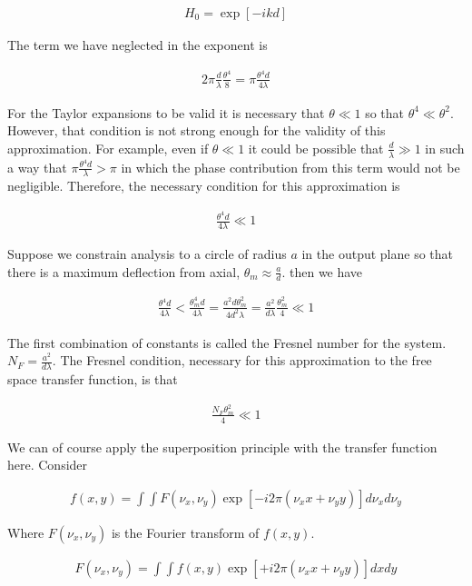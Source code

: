 \documentclass[12pt]{article}
\begin{document}
\begin{align}
H_0 = \exp[-ikd]
\end{align}

The term we have neglected in the exponent is

\begin{align}
2\pi \frac{d}{\lambda}\frac{\theta^4}{8} = \pi \frac{\theta^4 d}{4 \lambda}
\end{align}

For the Taylor expansions to be valid it is necessary that $\theta \ll 1$ so that $\theta^4 \ll \theta^2$. However, that condition is not strong enough for the validity of this approximation. For example, even if $\theta \ll 1$ it could be possible that $\frac{d}{\lambda} \gg 1$ in such a way that $\pi \frac{\theta^4 d}{\lambda} > \pi$ in which the phase contribution from this term would not be negligible. Therefore, the necessary condition for this approximation is 

\begin{align}
\frac{\theta^4 d}{4 \lambda} \ll 1
\end{align}

Suppose we constrain analysis to a circle of radius $a$ in the output plane so that there is a maximum deflection from axial, $\theta_m \approx \frac{a}{d}$. then we have

\begin{align}
\frac{\theta^4 d}{4 \lambda} < \frac{\theta_m^4 d}{4 \lambda} = \frac{a^2 d \theta_m^2}{4 d^2 \lambda} = \frac{a^2}{d\lambda} \frac{\theta_m^2}{4} \ll 1
\end{align}

The first combination of constants is called the Fresnel number for the system. $N_F = \frac{a^2}{d\lambda}$. The Fresnel condition, necessary for this approximation to the free space transfer function, is that

\begin{align}
\frac{N_F \theta_m^2}{4} \ll 1
\end{align}


We can of course apply the superposition principle with the transfer function here. Consider

\begin{align}
f(x,y) = \int \int F(\nu_x,\nu_y) \exp[-i 2\pi (\nu_x x +\nu_y y)] d\nu_x d\nu_y
\end{align}

Where $F(\nu_x,\nu_y)$ is the Fourier transform of $f(x,y)$.

\begin{align}
F(\nu_x,\nu_y) = \int \int f(x,y) \exp[+i 2\pi (\nu_x x +\nu_y y)] dx dy
\end{align}
\end{document}
